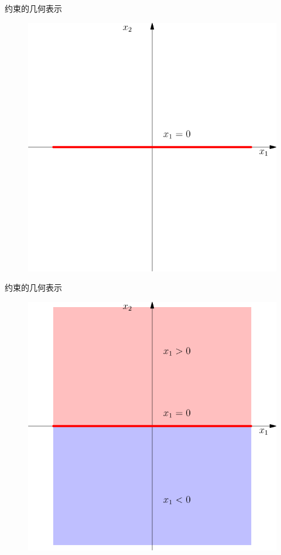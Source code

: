 \documentclass[UTF8]{ctexbeamer}
\begin{document}
\begin{frame}{约束的几何表示}
  \begin{figure}[b]
    \centering
    \includegraphics[width=.6\textwidth{}]{equal.pdf}
  \end{figure}
\end{frame}

\begin{frame}{约束的几何表示}
  \begin{figure}[b]
    \centering
    \includegraphics[width=.6\textwidth{}]{halfplane.pdf}
  \end{figure}  
\end{frame}
\end{document}
